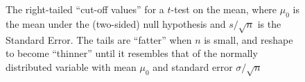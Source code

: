 \begin{figure}[h]
    \caption{The right-tailed ``cut-off values'' for a $t$-test on the mean, where $\mu_0$ is the mean under the (two-sided) null hypothesis and $s/\sqrt{n}$ is the Standard Error. The tails are ``fatter'' when $n$ is small, and reshape to become ``thinner'' until it resembles that of the normally distributed variable with mean $\mu_0$ and standard error $\sigma/\sqrt{n}$}
    \label{fig:priori4}
\end{figure}
\FloatBarrier

